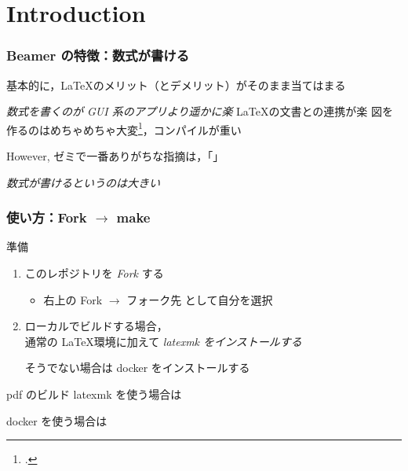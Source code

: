 \section{Introduction}

\begin{frame}
  \frametitle{Beamer の特徴：数式が書ける}
  
  基本的に，\LaTeX のメリット{\footnotesize （とデメリット）}がそのまま当てはまる
  \begin{itemize}
    \okitem \emph{数式を書くのが GUI 系のアプリより遥かに楽}
    \okitem \LaTeX の文書との連携が楽
    \ngitem 図を作るのはめちゃめちゃ大変\footcite{tikz-nakata}，コンパイルが重い
  \end{itemize}

  \begin{block}{However, }
    ゼミで一番ありがちな指摘は，「」
    \begin{itemize}
      \thusitem \emph{数式が書けるというのは大きい}
    \end{itemize}
  \end{block}
\end{frame}

\begin{frame}
  \frametitle{使い方：Fork \(\rightarrow\) make} 

  \begin{block}{準備}
    \begin{enumerate}
    \item
      このレポジトリを \emph{Fork} する
      \begin{itemize}
        \item 右上の Fork \(\rightarrow\) フォーク先 として自分を選択
      \end{itemize}
    \item
      ローカルでビルドする場合，\\
      通常の \LaTeX 環境に加えて \emph{latexmk をインストールする}
      \begin{itemize}
        \butitem そうでない場合は docker をインストールする
      \end{itemize}
    \end{enumerate}
  \end{block}

  \begin{block}{pdf のビルド}
  latexmk を使う場合は\ \hbox{}
  \begin{itemize}
    \butitem
    docker を使う場合は\ \hbox{}
  \end{itemize}
  \end{block}
\end{frame}

